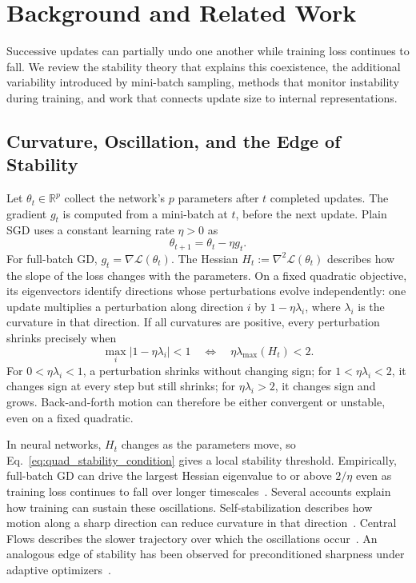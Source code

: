 \section{Background and Related Work}
\label{sec:background}

Successive updates can partially undo one another while training loss continues to fall. We review the stability theory that explains this coexistence, the additional variability introduced by mini-batch sampling, methods that monitor instability during training, and work that connects update size to internal representations.

\subsection{Curvature, Oscillation, and the Edge of Stability}

Let $\theta_t\in\mathbb{R}^p$ collect the network's $p$ parameters after $t$ completed updates. The gradient $g_t$ is computed from a mini-batch at $t$, before the next update. Plain SGD uses a constant learning rate $\eta>0$ as
\begin{equation}
  \theta_{t+1}=\theta_t-\eta g_t.
  \label{eq:sgd_map_stability}
\end{equation}
For full-batch GD, $g_t=\nabla\mathcal L(\theta_t)$. The Hessian $H_t:=\nabla^2\mathcal L(\theta_t)$ describes how the slope of the loss changes with the parameters. On a fixed quadratic objective, its eigenvectors identify directions whose perturbations evolve independently: one update multiplies a perturbation along direction $i$ by $1-\eta\lambda_i$, where $\lambda_i$ is the curvature in that direction. If all curvatures are positive, every perturbation shrinks precisely when~\cite{polyak1964methods,bertsekas1997nonlinear}
\begin{equation}
  \max_i|1-\eta\lambda_i|<1
  \quad\Longleftrightarrow\quad
  \eta\lambda_{\max}(H_t)<2.
  \label{eq:quad_stability_condition}
\end{equation}
For $0<\eta\lambda_i<1$, a perturbation shrinks without changing sign; for $1<\eta\lambda_i<2$, it changes sign at every step but still shrinks; for $\eta\lambda_i>2$, it changes sign and grows. Back-and-forth motion can therefore be either convergent or unstable, even on a fixed quadratic.

In neural networks, $H_t$ changes as the parameters move, so Eq.~\eqref{eq:quad_stability_condition} gives a local stability threshold. Empirically, full-batch GD can drive the largest Hessian eigenvalue to or above $2/\eta$ even as training loss continues to fall over longer timescales~\cite{cohen2021edge,arora2022understanding}. Several accounts explain how training can sustain these oscillations. Self-stabilization describes how motion along a sharp direction can reduce curvature in that direction~\cite{damian2023self}. Central Flows describes the slower trajectory over which the oscillations occur~\cite{cohen2025central}. An analogous edge of stability has been observed for preconditioned sharpness under adaptive optimizers~\cite{cohen2022adaptive}.

